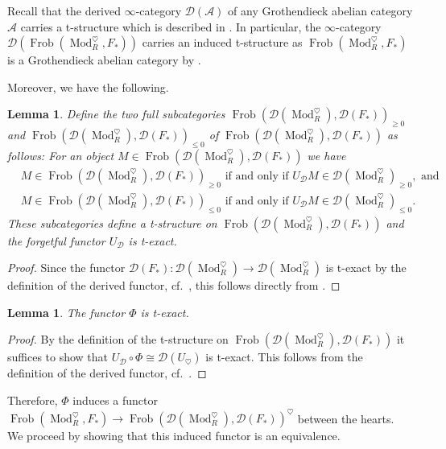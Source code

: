 \documentclass{article}
\theoremstyle{definition}
\theoremstyle{definition}
\theoremstyle{definition}
\theoremstyle{plain}
\newtheorem{lem}[defn]{Lemma}
\theoremstyle{plain}
\theoremstyle{plain}
\theoremstyle{plain}
\theoremstyle{plain}
\theoremstyle{plain}
\theoremstyle{plain}
\theoremstyle{plain}
\theoremstyle{remark}
\theoremstyle{remark}
\theoremstyle{plain}
\theoremstyle{plain}
\theoremstyle{plain}
\theoremstyle{plain}
\theoremstyle{plain}
\newcommand{\ModDisc}[1]{\operatorname{Mod}_{#1}^{\heartsuit}}
\newcommand{\Frob}[2]{\operatorname{Frob}(#1, #2)}
\newcommand{\Cat}[1]{\mathcal{#1}}
\begin{document}
Recall that the derived $\infty$-category $\Cat D(\Cat A)$ of any Grothendieck abelian category $\Cat A$ carries a t-structure which is described in \cite[Definition 1.3.5.16]{higheralgebra}. 
In particular, the $\infty$-category $\Cat D(\Frob{\ModDisc{R}}{F_*})$ carries an induced t-structure as $\Frob{\ModDisc{R}}{F_*}$ is a Grothendieck abelian category by .

Moreover, we have the following.

\begin{lem}
    Define the two full subcategories $\Frob{\Cat D(\ModDisc{R})}{\Cat D(F_*)}_{\geq 0}$ and 
    $\Frob{\Cat D(\ModDisc{R})}{\Cat D(F_*)}_{\leq 0}$ of 
    $\Frob{\Cat D(\ModDisc{R})}{\Cat D(F_*)}$ as follows: 
    For an object $M \in \Frob{\Cat D(\ModDisc{R})}{\Cat D(F_*)}$ 
    we have
    \begin{align*}
        &M \in \Frob{\Cat D(\ModDisc{R})}{\Cat D(F_*)}_{\geq 0} \text{ if and only if } U_{\Cat D}M \in \Cat D(\ModDisc{R})_{\geq 0}, \text{ and} \\
        &M \in \Frob{\Cat D(\ModDisc{R})}{\Cat D(F_*)}_{\leq 0} \text{ if and only if } U_{\Cat D}M \in \Cat D(\ModDisc{R})_{\leq 0}.
    \end{align*}
    These subcategories define a t-structure on $\Frob{\Cat D(\ModDisc{R})}{\Cat D(F_*)}$ and the forgetful functor $U_{\Cat D}$ is t-exact.
\end{lem}
\begin{proof}
    Since the functor $\Cat D(F_*)\colon \Cat D(\ModDisc{R}) \to \Cat D(\ModDisc{R})$ is t-exact by the definition of the derived functor, cf.\ \cite[Notation A.3]{cartmod},
    this follows directly from \cite[Proposition 3.3]{cartmod}.
\end{proof}

\begin{lem} \label{lem:affine:Phi-t-exact}
    The functor $\Phi$ is t-exact.
\end{lem}
\begin{proof}
    By the definition of the t-structure on $\Frob{\Cat D(\ModDisc{R})}{\Cat D(F_*)}$
    it suffices to show that $U_{\Cat D} \circ \Phi \cong \Cat D(U_{\heartsuit})$ is t-exact.
    This follows from the definition of the derived functor, cf.\ \cite[Notation A.3]{cartmod}.
\end{proof}

Therefore, $\Phi$ induces a functor $\Frob{\ModDisc{R}}{F_*} \to \Frob{\Cat D(\ModDisc{R})}{\Cat D(F_*)}^\heartsuit$ 
between the hearts. We proceed by showing that this induced functor is an equivalence.
\end{document}
